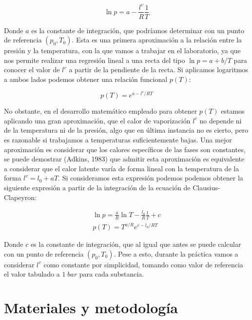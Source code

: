 \documentclass[a4paper,12pt,titlepage]{article}
\begin{document}
\begin{equation}
    \ln p = a - \frac{l^v}{R}\frac{1}{T}
    \label{ln p}
\end{equation}

Donde $a$ es la constante de integración, que podríamos determinar con un punto de referencia $(p_0,T_0)$. Esta es una primera aproximación a la relación entre la presión y la temperatura, con la que vamos a trabajar en el laboratorio, ya que nos permite realizar una regresión lineal a una recta del tipo $\ln p = a + b/T$ para conocer el valor de $l^v$ a partir de la pendiente de la recta. Si aplicamos logaritmos a ambos lados podemos obtener una relación funcional $p(T)$:

\begin{equation}
    p(T) = e^{a-l^v/RT}
\end{equation}

No obstante, en el desarrollo matemático empleado para obtener $p(T)$ estamos aplicando una gran aproximación, que el calor de vaporización $l^v$ no depende ni de la temperatura ni de la presión, algo que en última instancia no es cierto, pero es razonable si trabajamos a temperaturas suficientemente bajas. Una mejor aproximación es considerar que los calores específicos de las fases son constantes, se puede demostrar (Adkins, 1983) que admitir esta aproximación es equivalente a considerar que el calor latente varía de forma lineal con la temperatura de la forma $l^v = l_0 + aT$. Si consideramos esta expresión podemos podemos obtener la siguiente expresión a partir de la integración de la ecuación de Clausius-Clapeyron:

\begin{equation}
    \begin{gathered}
    \ln p = \frac{a}{R} \ln T - \frac{l_0}{R}\frac{1}{T} + c \\
    p(T) = T^{a/R} e^{c-l_0/RT}
    \label{l lineal}
    \end{gathered}
\end{equation}

Donde $c$ es la constante de integración, que al igual que antes se puede calcular con un punto de referencia $(p_0,T_0)$. Pese a esto, durante la práctica vamos a considerar $l^v$ como constante por simplicidad, tomando como valor de referencia el valor tabulado a $1\;bar$ para cada substancia.

\section{Materiales y metodología}
\end{document}
